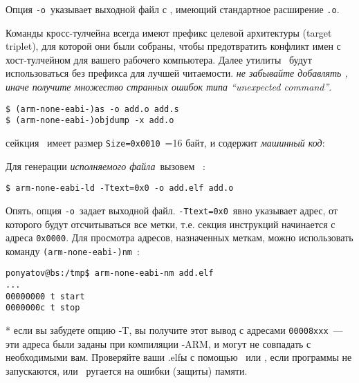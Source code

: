 Опция \verb|-o|\ указывает выходной файл с , имеющий стандартное расширение \verb|.o|.

\begin{framed}
\noindent Команды кросс-тулчейна всегда имеют префикс целевой архитектуры
(target triplet), для которой они были собраны, чтобы предотвратить
конфликт имен с хост-тулчейном для вашего рабочего компьютера. Далее утилиты
\gnut\ будут использоваться без префикса для лучшей читаемости. \emph{не
забывайте добавлять , иначе получите множество странных
ошибок типа ``unexpected command''}.
\end{framed}

\begin{verbatim}
$ (arm-none-eabi-)as -o add.o add.s
$ (arm-none-eabi-)objdump -x add.o
\end{verbatim}

сейкция \ имеет размер \verb|Size=0x0010|\ =16 байт, и содержит
\emph{машинный код}:


\bigskip
Для генерации \emph{исполняемого файла}\ вызовем \ :

\begin{verbatim}
$ arm-none-eabi-ld -Ttext=0x0 -o add.elf add.o
\end{verbatim}

Опять, опция \verb|-o|\ задает выходной файл. \verb|-Ttext=0x0|\ явно указывает
адрес, от которого будут отсчитываться все метки, т.е. секция инструкций
начинается с адреса \verb|0x0000|. Для просмотра адресов, назначенных меткам,
можно использовать команду \verb|(arm-none-eabi-)nm|\ :

\begin{verbatim}
ponyatov@bs:/tmp$ arm-none-eabi-nm add.elf
...
00000000 t start
0000000c t stop
\end{verbatim}
* если вы забудете опцию -T, вы получите этот вывод с адресами \verb|00008xxx|\
--- эти адреса были заданы при компиляции \gnut-ARM, и могут не совпадать
с необходимыми вам. Проверяйте ваши .elfы с помощью \prog{nm}\ или
\prog{objdump}, если программы не запускаются, или \qemu\ ругается на ошибки
(защиты) памяти.
\bigskip

